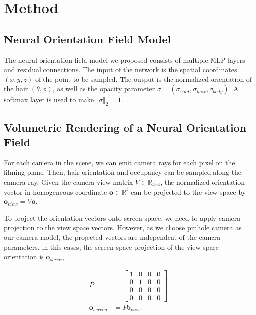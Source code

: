\documentclass[12pt]{article}
\begin{document}
\section{Method}


\subsection{Neural Orientation Field Model}

The neural orientation field model we proposed consists of multiple MLP layers and residual connections. The input of the network is the spatial coordinates $(x, y, z)$ of the point to be sampled. The output is the normalized orientation of the hair $(\theta, \phi)$, as well as the opacity parameter $\sigma = (\sigma_{void}, \sigma_{hair}, \sigma_{body})$. A softmax layer is used to make $\Vert \sigma \Vert_{2} = 1$.

\subsection{Volumetric Rendering of a Neural Orientation Field}

For each camera in the scene, we can emit camera rays for each pixel on the filming plane. Then, hair orientation and occupancy can be sampled along the camera ray. Given the camera view matrix $V \in \mathbb{R}_{4x4}$, the normalized orientation vector in homogeneous coordinate $\mathbf{o} \in \mathbb{R}^{4}$ can be projected to the view space by $\mathbf{o}_{view} = V\mathbf{o}$.

To project the orientation vectors onto screen space, we need to apply camera projection to the view space vectors. However, as we choose pinhole camera as our camera model, the projected vectors are independent of the camera parameters. In this cases, the screen space projection of the view space orientation is $\mathbf{o}_{screen}$

\begin{align}
	P &= \begin{bmatrix}
        1 & 0 & 0 & 0 \\
        0 & 1 & 0 & 0 \\
        0 & 0 & 0 & 0 \\
        0 & 0 & 0 & 0
    \end{bmatrix} \\
	\mathbf{o}_{screen} & = P\mathbf{o}_{view}
\end{align}
\end{document}
